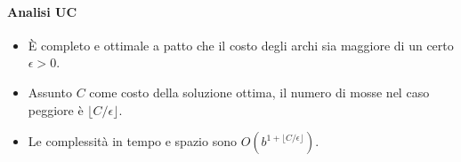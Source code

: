 \paragraph{Analisi UC}
\begin{itemize}
	\item \`E completo e ottimale a patto che il costo degli archi sia maggiore di un certo
	      $\epsilon > 0$.
	\item Assunto $C$ come costo della soluzione ottima, il numero di mosse nel caso peggiore \`e
	      $\lfloor C/\epsilon \rfloor$.
	\item Le complessit\`a in tempo e spazio sono $O(b^{1+\lfloor C/\epsilon \rfloor})$.
\end{itemize}